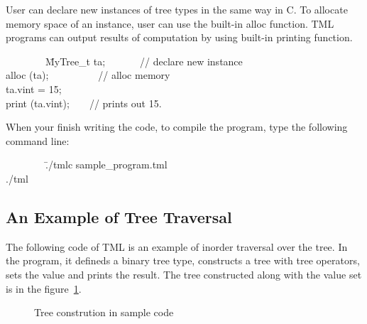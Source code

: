\documentclass[12pt,psfig,a4]{article}
\begin{document}
User can declare new instances of tree types in the same way in C. To allocate memory space of an instance, user can use the built-in alloc function.
TML programs can output results of computation by using built-in printing function.

\begin{code}
\begin{tabbing}
~~~~~~~~\=MyTree\_t ta;~~~~~~~// declare new instance\\
\> alloc (ta);~~~~~~~~~~// alloc memory\\
\> ta.vint = 15;\\
\> print (ta.vint);~~~~// prints out 15.\\
\end{tabbing}
\end{code}

When your finish writing the code, to compile the program, type the following command line:
\begin{code}
\begin{tabbing}
~~~~~~~~\=./tmlc sample\_program.tml\\
\> ./tml\\
\end{tabbing}
\end{code}

\subsection {An Example of Tree Traversal}
The following code of TML is an example of inorder traversal over the tree. In the program, it defineds a binary tree type, constructs a tree with tree operators, sets the value and prints the result.
The tree constructed along with the value set is in the figure~\ref{bintree}.

\begin{figure}[h!]
{\centering {} \par}
\caption{Tree constrution in sample code}
\label{bintree}
\end{figure}
\end{document}

